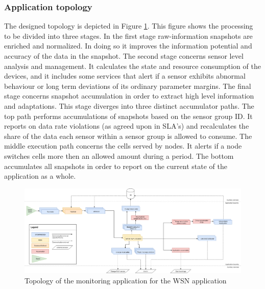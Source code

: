 \subsubsection{Application topology}
The designed topology is depicted in Figure \ref{fig:sensit_topology}. This figure shows the processing to be divided into three stages. In the first stage raw-information snapshots are enriched and normalized. In doing so it improves the information potential and accuracy of the data in the snapshot. The second stage concerns sensor level analysis and management. It calculates the state and resource consumption of the devices, and it includes some services that alert if a sensor exhibits abnormal behaviour or long term deviations of its ordinary parameter margins. The final stage concerns snapshot accumulation in order to extract high level information and adaptations. This stage diverges into three distinct accumulator paths. The top path performs accumulations of snapshots based on the sensor group ID. It reports on data rate violations (as agreed upon in SLA's) and recalculates the share of the data each sensor within a sensor group is allowed to consume. The middle execution path concerns the cells served by nodes. It alerts if a node switches cells more then an allowed amount during a period. The bottom accumulates all snapshots in order to report on the current state of the application as a whole.
\begin{figure}
\centering
\includegraphics[width=1.15\textwidth]{resources/img/sensit_topology.png}
\caption{Topology of the monitoring application for the \nedap\idsystems\sensit WSN application}
\label{fig:sensit_topology}
\end{figure}

